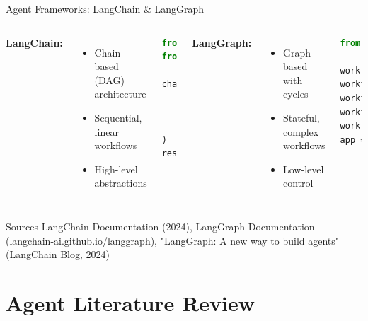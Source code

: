 \documentclass[aspectratio=169]{beamer}
\begin{document}
\begin{frame}[fragile]{Agent Frameworks: LangChain \& LangGraph}
	\begin{columns}
		\textbf{LangChain:}
		\begin{itemize}
			\item {\color{highlight}Chain-based} (DAG) architecture
			\item Sequential, linear workflows
			\item High-level abstractions
		\end{itemize}
		\begin{lstlisting}[language=python, basicstyle=\tiny]
from langchain.chains import LLMChain
from langchain.llms import OpenAI

chain = LLMChain(
    llm=OpenAI(),
    prompt=prompt_template,
    memory=ConversationBufferMemory()
)
result = chain.run(query)
		\end{lstlisting}
		
		\textbf{LangGraph:}
		\begin{itemize}
			\item {\color{highlight}Graph-based} with cycles
			\item Stateful, complex workflows
			\item Low-level control
		\end{itemize}
		\begin{lstlisting}[language=python, basicstyle=\tiny]
from langgraph.graph import StateGraph

workflow = StateGraph(state_schema)
workflow.add_node("plan", planning_node)
workflow.add_node("act", action_node)
workflow.add_edge("plan", "act")
workflow.add_conditional_edges("act", should_continue)
app = workflow.compile()
		\end{lstlisting}
	\end{columns}
	
	\vspace{0.3cm}
	\begin{block}{Sources}
		\footnotesize
		LangChain Documentation (2024), LangGraph Documentation (langchain-ai.github.io/langgraph), "LangGraph: A new way to build agents" (LangChain Blog, 2024)
	\end{block}
\end{frame}

\section{Agent Literature Review}
\end{document}
